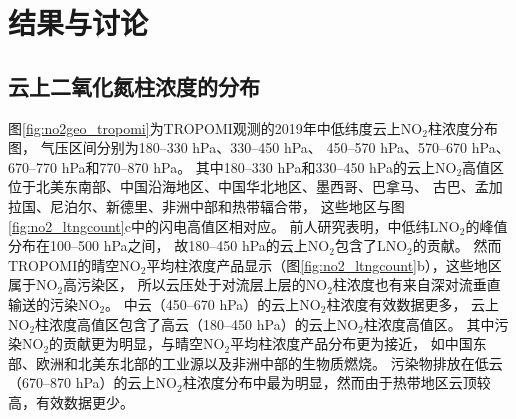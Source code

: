 


\section{结果与讨论}

\subsection{云上二氧化氮柱浓度的分布} \label{sec:no2_vcd_cld}

图\ref{fig:no2geo_tropomi}为TROPOMI观测的2019年中低纬度云上NO$_2$柱浓度分布图，
气压区间分别为180--330 hPa、330--450 hPa、
450--570 hPa、570--670 hPa、670--770 hPa和770--870 hPa。
其中180--330 hPa和330--450 hPa的云上NO$_2$高值区位于北美东南部、中国沿海地区、中国华北地区、墨西哥、巴拿马、
古巴、孟加拉国、尼泊尔、新德里、非洲中部和热带辐合带，
这些地区与图\ref{fig:no2_ltngcount}c中的闪电高值区相对应。
前人研究表明，中低纬LNO$_2$的峰值分布在100--500 hPa之间\citep{Pickering.1988,Ott.2010,Luo.2017}，
故180--450 hPa的云上NO$_2$包含了LNO$_2$的贡献。
然而TROPOMI的晴空NO$_2$平均柱浓度产品显示（图\ref{fig:no2_ltngcount}b），这些地区属于NO$_2$高污染区，
所以云压处于对流层上层的NO$_2$柱浓度也有来自深对流垂直输送的污染NO$_2$。
中云（450--670 hPa）的云上NO$_2$柱浓度有效数据更多，
云上NO$_2$柱浓度高值区包含了高云（180--450 hPa）的云上NO$_2$柱浓度高值区。
其中污染NO$_2$的贡献更为明显，与晴空NO$_2$平均柱浓度产品分布更为接近，
如中国东部、欧洲和北美东北部的工业源以及非洲中部的生物质燃烧。
污染物排放在低云（670--870 hPa）的云上NO$_2$柱浓度分布中最为明显，然而由于热带地区云顶较高，有效数据更少。


